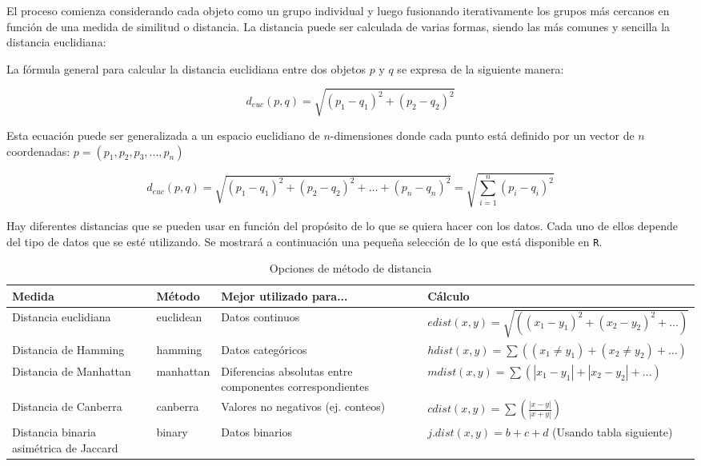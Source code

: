 El proceso comienza considerando cada objeto como un grupo individual y luego fusionando iterativamente los grupos más cercanos en función de una medida de similitud o distancia. La distancia puede ser calculada de varias formas, siendo las más comunes y sencilla la distancia euclidiana: 

La fórmula general para calcular la distancia euclidiana entre dos objetos \(p\) y \(q\) se expresa de la siguiente manera:

\[
d_{euc}(p,q) = \sqrt{(p_{1} - q_{1})^2 + (p_{2} - q_{2})^2}
\]

Esta ecuación puede ser generalizada a un espacio euclidiano de \(n\)-dimensiones donde cada punto está definido por un vector de \(n\) coordenadas: \(p = (p_{1},p_{2},p_{3},...,p_{n})\)

\[
d_{euc}(p,q) = \sqrt{(p_{1} - q_{1})^2 + (p_{2} - q_{2})^2 + \ldots + (p_{n} - q_{n})^2} = \sqrt{\sum_{i=1}^{n}(p_{i} - q_{i})^2}
\]

Hay diferentes distancias que se pueden usar en función del propósito de lo que se quiera hacer con los datos. Cada uno de ellos depende del tipo de datos que se esté utilizando. Se mostrará a continuación una pequeña selección de lo que está disponible en \texttt{R}.
\begin{table}[H]
    \centering
    \caption{Opciones de método de distancia}
    \begin{tabular}{|p{3cm}|p{2.5cm}|p{4.5cm}|p{6cm}|}
    \hline
    \textbf{Medida} & \textbf{Método} & \textbf{Mejor utilizado para...} & \textbf{Cálculo} \\
    \hline
    Distancia euclidiana & euclidean & Datos continuos & \(edist(x, y) = \sqrt{((x_1 - y_1)^2 + (x_2 - y_2)^2 + \ldots)}\) \\
    \hline
    Distancia de Hamming & hamming & Datos categóricos & \(hdist(x, y) = \sum((x_1 \neq y_1) + (x_2 \neq y_2) + \ldots)\) \\
    \hline
    Distancia de Manhattan & manhattan & Diferencias absolutas entre componentes correspondientes & \(mdist(x, y) = \sum(|x_1 - y_1| + |x_2 - y_2| + \ldots)\) \\
    \hline
    Distancia de Canberra & canberra & Valores no negativos (ej. conteos) & \(cdist(x, y) = \sum\left(\frac{|x - y|}{|x + y|}\right)\) \\
    \hline
    Distancia binaria asimétrica de Jaccard & binary & Datos binarios & \(j.dist(x, y) = b + c + d\) (Usando tabla siguiente) \\
    \hline
    \end{tabular}
\end{table}

